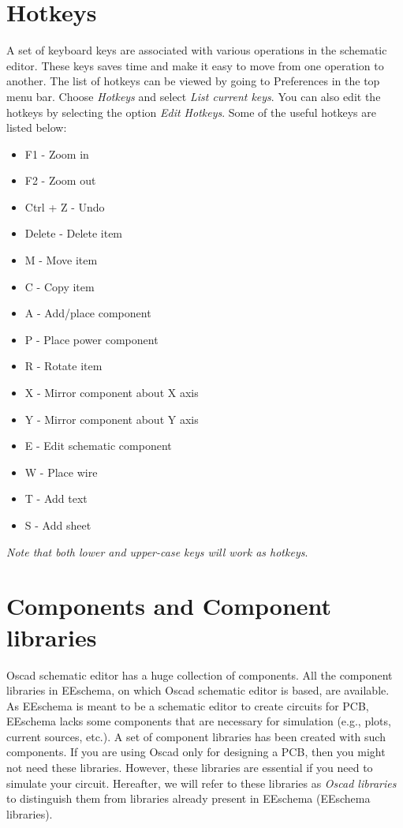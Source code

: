 \section{Hotkeys} 
\label{short}
A set of keyboard keys are associated with various operations in the schematic editor. These keys saves time and make it easy to move from one operation to another. The list of hotkeys can be viewed by going to Preferences in the top menu bar. Choose \textit{Hotkeys} and select \textit{List current keys}. You can also edit the hotkeys by selecting the option \textit{Edit Hotkeys}.
Some of the useful hotkeys are listed below:
\begin{itemize}
\item F1 - Zoom in
\item F2 - Zoom out
\item Ctrl + Z - Undo
\item Delete - Delete item
\item M - Move item
\item C - Copy item
\item A - Add/place component 
\item P - Place power component
\item R - Rotate item
\item X - Mirror component about X axis
\item Y - Mirror component about Y axis
\item E - Edit schematic component
\item W - Place wire
\item T - Add text
\item S - Add sheet
\end{itemize}
\textit{Note that both lower and upper-case keys will work as hotkeys}.
\section{Components and Component libraries}
\label{component}
Oscad schematic editor has a huge collection of components. All the component libraries in EEschema, on which Oscad schematic editor is based, are available. As EEschema is meant to be a schematic editor to create circuits for PCB, EEschema lacks some components that are necessary for simulation (e.g., plots, current sources, etc.). A set of component libraries has been created with such components. 
If you are using Oscad only for designing a PCB, then you might not need these libraries. However, these libraries are essential if you need to simulate your circuit. Hereafter, we will refer to these libraries as \textit{Oscad libraries} to distinguish them from libraries already present in EEschema (EEschema libraries).
